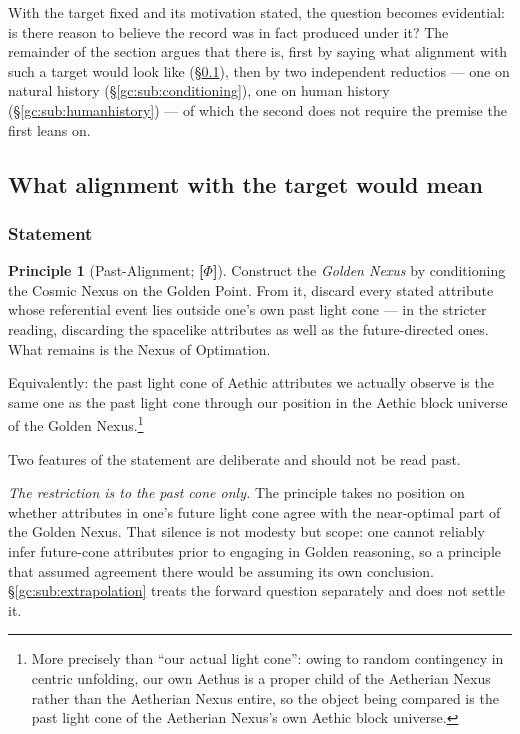 \documentclass[11pt]{article}
\numberwithin{equation}{section}
\theoremstyle{plain}
\theoremstyle{definition}
\newtheorem{principle}{Principle}
\theoremstyle{remark}
\begin{document}
With the target fixed and its motivation stated, the question becomes
evidential: is there reason to believe the record was in fact produced
under it? The remainder of the section argues that there is, first by
saying what alignment with such a target would look like
(\S\ref{gc:sub:pastalign}), then by two independent reductios --- one on
natural history (\S\ref{gc:sub:conditioning}), one on human history
(\S\ref{gc:sub:humanhistory}) --- of which the second does not require
the premise the first leans on.

\subsection{What alignment with the target would mean}\label{gc:sub:pastalign}

\subsubsection{Statement}\label{gc:subsub:pastalign-statement}

\begin{principle}[Past-Alignment; \textbf{[$\Phi$]}]
\label{gc:prin:pastalign}
Construct the \emph{Golden Nexus} by conditioning the Cosmic Nexus on
the Golden Point. From it, discard every stated attribute whose
referential event lies outside one's own past light cone --- in the
stricter reading, discarding the spacelike attributes as well as the
future-directed ones. What remains is the Nexus of Optimation.

Equivalently: the past light cone of Aethic attributes we actually
observe is the same one as the past light cone through our position in
the Aethic block universe of the Golden Nexus.\footnote{More precisely
than ``our actual light cone'': owing to random contingency in centric
unfolding, our own Aethus is a proper child of the Aetherian Nexus
rather than the Aetherian Nexus entire, so the object being compared is
the past light cone of the Aetherian Nexus's own Aethic block universe.}
\end{principle}

Two features of the statement are deliberate and should not be read past.

\emph{The restriction is to the past cone only.} The principle takes no
position on whether attributes in one's future light cone agree with the
near-optimal part of the Golden Nexus. That silence is not modesty but
scope: one cannot reliably infer future-cone attributes prior to
engaging in Golden reasoning, so a principle that assumed agreement
there would be assuming its own conclusion.
\S\ref{gc:sub:extrapolation} treats the forward question separately and
does not settle it.
\end{document}

